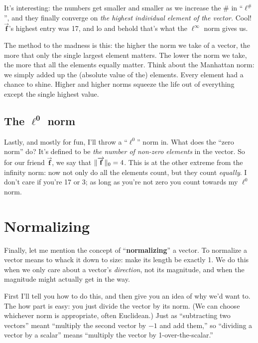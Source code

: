 It's interesting: the numbers get smaller and smaller as we increase the \# in
``$\ell^{\#}$'', and they finally converge on \textit{the highest individual
element of the vector.} Cool! $\overrightarrow{\textbf{f}}$'s highest entry was
17, and lo and behold that's what the $\ell^\infty$ norm gives us.

The method to the madness is this: the higher the norm we take of a vector, the
more that only the single largest element matters. The lower the norm we take,
the more that all the elements equally matter. Think about the Manhattan norm:
we simply added up the (absolute value of the) elements. Every element had a
chance to shine. Higher and higher norms squeeze the life out of everything
except the single highest value.

\subsection{The $\boldsymbol\ell^\textbf{0}$ norm}

Lastly, and mostly for fun, I'll throw a ``$\ell^0$'' norm in. What does the
``zero norm'' do? It's defined to be \textit{the number of non-zero elements}
in the vector. So for our friend $\overrightarrow{\textbf{f}}$, we say that
$\lVert\overrightarrow{\textbf{f}}\rVert_0 = 4$. This is at the other extreme from the
infinity norm: now not only do all the elements count, but they count
\textit{equally}. I don't care if you're 17 or 3; as long as you're not zero
you count towards my $\ell^0$ norm.

\section{Normalizing}

\label{normalizing}

Finally, let me mention the concept of ``\textbf{normalizing}'' a vector. To
normalize a vector means to whack it down to size: make its length be exactly
1. We do this when we only care about a vector's \textit{direction}, not its
magnitude, and when the magnitude might actually get in the way.

First I'll tell you how to do this, and then give you an idea of why we'd want
to. The how part is easy: you just divide the vector by its norm. (We can
choose whichever norm is appropriate, often Euclidean.) Just as ``subtracting
two vectors'' meant ``multiply the second vector by $-1$ and add them,'' so
``dividing a vector by a scalar'' means ``multiply the vector by
1-over-the-scalar.''

